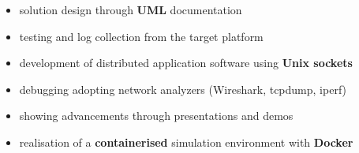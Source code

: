 \documentclass[letterpaper]{twentysecondcv} %
\begin{document}
\begin{twenty}
{\begin{itemize}
                \item solution design through \textbf{UML} documentation
                \item testing and log collection from the target platform
                \item development of distributed application software using \textbf{Unix sockets}
                \item debugging adopting network analyzers (Wireshark, tcpdump, iperf)
                \item showing advancements through presentations and demos
                \item realisation of a \textbf{containerised} simulation environment with \textbf{Docker}
            \end{itemize}

}
\end{twenty}
\end{document}
